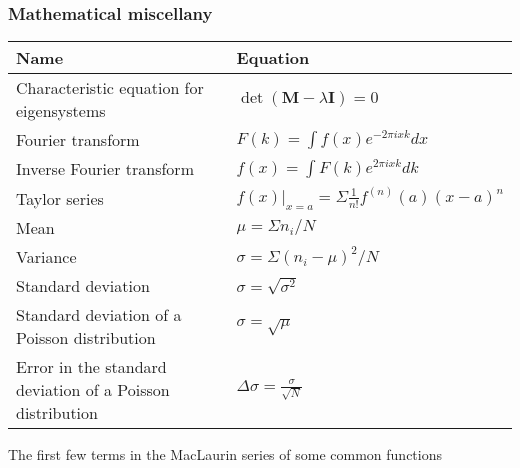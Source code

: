 \documentclass[11pt]{paper}
\begin{document}
\newpage

\subsubsection*{Mathematical miscellany}
\label{subsec:misc}
\centering
\label{my-label}
\bgroup
\def\arraystretch{2}
\begin{longtable}{ll}
\textbf{Name}       & \textbf{Equation}          \\ \hline
\multicolumn{1}{|l|}{Characteristic equation for eigensystems} & \multicolumn{1}{l|}{$\det\left(\mathbf{M}-\lambda\mathbf{I}\right)=0$} \\ \hline
\multicolumn{1}{|l|}{Fourier transform} & \multicolumn{1}{l|}{$F(k) = \int f(x)e^{-2\pi i x k} dx$} \\ \hline
\multicolumn{1}{|l|}{Inverse Fourier transform} & \multicolumn{1}{l|}{$f(x) = \int F(k)e^{2\pi i x k} dk$} \\ \hline
\multicolumn{1}{|l|}{Taylor series} & \multicolumn{1}{l|}{$f(x)|_{x=a} = \Sigma \frac{1}{n!}f^{(n)}(a)(x-a)^n$} \\ \hline
\multicolumn{1}{|l|}{Mean} & \multicolumn{1}{l|}{$\mu = \Sigma n_i / N$} \\ \hline
\multicolumn{1}{|l|}{Variance} & \multicolumn{1}{l|}{$\sigma = \Sigma(n_i - \mu)^2/N$} \\ \hline
\multicolumn{1}{|l|}{Standard deviation} & \multicolumn{1}{l|}{$\sigma = \sqrt{\sigma^2}$} \\ \hline
\multicolumn{1}{|l|}{Standard deviation of a Poisson distribution} & \multicolumn{1}{l|}{$\sigma = \sqrt{\mu}$} \\ \hline
\multicolumn{1}{|l|}{Error in the standard deviation of a Poisson distribution} & \multicolumn{1}{l|}{$\Delta\sigma = \frac{\sigma}{\sqrt{N}}$} \\ \hline
\end{longtable}
The first few terms in the MacLaurin series of some common functions
\label{my-label}
\bgroup
\def\arraystretch{2}
\end{document}
